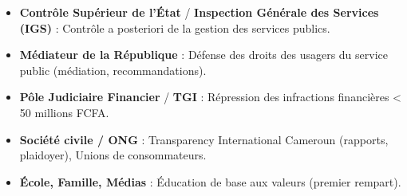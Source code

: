 \documentclass[11pt]{article}
\begin{document}
\begin{aretenir}
\begin{itemize}
    \item \textbf{Contrôle Supérieur de l'État} / \textbf{Inspection Générale des Services (IGS)} : Contrôle a posteriori de la gestion des services publics.
    \item \textbf{Médiateur de la République} : Défense des droits des usagers du service public (médiation, recommandations).
    \item \textbf{Pôle Judiciaire Financier} / \textbf{TGI} : Répression des infractions financières < 50 millions FCFA.
    \item \textbf{Société civile / ONG} : Transparency International Cameroun (rapports, plaidoyer), Unions de consommateurs.
    \item \textbf{École, Famille, Médias} : Éducation de base aux valeurs (premier rempart).
\end{itemize}
\end{aretenir}
\end{document}
